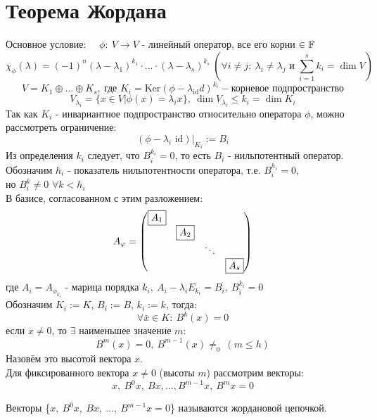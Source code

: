 \section{Теорема Жордана}
    Основное условие: \ \  $\phi: \ V \to V$ - линейный оператор, все его корни $\in \mathbb{F}$
    $$\chi_{\phi}(\lambda) = (-1)^n(\lambda-\lambda_1)^{k_1}\cdot\ldots\cdot(\lambda-\lambda_s)^{k_s} \ (\forall i\neq j: \ \lambda_i\neq\lambda_j \text{ и } \sum \limits_{i=1}^s k_i = \dim V)$$
    $$V = K_1\oplus\ldots\oplus K_s, \ \text{где } K_i = \text{Ker}(\phi-\lambda_\text{id}d)^{k_i} - \text{корневое подпространство}$$
    $$V_{\lambda_i} = \{x\in V|\phi(x) = \lambda_ix\}, \  \dim V_{\lambda_i}\leqslant k_i = \dim K_i$$
    Так как $K_i$ - инвариантное подпространство относительно оператора $\phi$, можно рассмотреть ограничение: 
    $$(\phi-\lambda_i \text{ id})|_{K_i} := B_i$$
    Из определения $k_i$ следует, что $B_i^{k_i}=0$, то есть $B_i$ - нильпотентный оператор.\\
    Обозначим $h_i$ - показатель нильпотентности оператора, т.е. $B_i^{h_i}=0$,\\ 
    но $B_i^k\neq0$ $\forall k < h_i$\\
    В базисе, согласованном с этим разложением: 
    $$A_{\phi} = \begin{pmatrix}
    \text{\fbox{$A_1$}}\\
    \null & \text{\fbox{$A_2$}}\\
    \null & \null & \ddots\\
    \null & \null & \null & \text{\fbox{$A_s$}}
    \end{pmatrix}$$
    где $A_i = A_{\phi_{k_i}}$ - марица порядка $k_i, \  A_i-\lambda_iE_{k_i} = B_i, \ B_i^{k_i}=0$\\
    Обозначим $K_i :=K$, $B_i :=B$, $k_i :=k$, тогда: 
    $$\forall \bar{x}\in K: \  B^k(x) = 0$$
    если $x\neq0$, то $\exists$ наименьшее значение $m$: 
    $$B^m(x) = 0, \ B^{m-1}(x)\neq_0 \ (m\leqslant h)$$ 
    Назовём это высотой вектора $x$.\\
    Для фиксированного вектора $x\neq0$ (высоты $m$) рассмотрим векторы: 
    $$x, \ B^0x, \ Bx, \ldots,B^{m-1}x, \ B^mx = 0$$
    \begin{definition}
        Векторы \{$x,\ B^0x,\ Bx,\ \ldots,\  B^{m-1}x = 0$\} называются жордановой цепочкой.
    \end{definition}  
